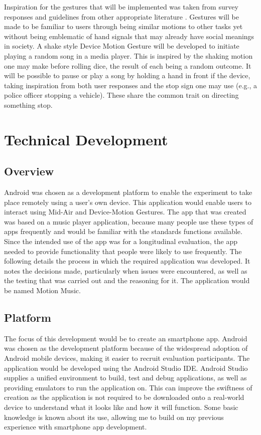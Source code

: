 \documentclass{l4proj}
\begin{document}
Inspiration for the gestures that will be implemented was taken from survey responses and guidelines from other appropriate literature \citep{rico_usable_2010}. Gestures will be made to be familiar to users through being similar motions to other tasks yet without being emblematic of hand signals that may already have social meanings in society. A shake style Device Motion Gesture will be developed to initiate playing a random song in a media player. This is inspired by the shaking motion one may make before rolling dice, the result of each being a random outcome. It will be possible to pause or play a song by holding a hand in front if the device, taking inspiration from both user responses and the stop sign one may use (e.g., a police officer stopping a vehicle). These share the common trait on directing something stop.


\chapter{Technical Development}

\section{Overview}
Android was chosen as a development platform to enable the experiment to take place remotely using a user's own device. This application would enable users to interact using Mid-Air and Device-Motion Gestures. The app that was created was based on a music player application, because many people use these types of apps frequently and would be familiar with the standards functions available. Since the intended use of the app was for a longitudinal evaluation, the app needed to provide functionality that people were likely to use frequently. The following details the process in which the required application was developed. It notes the decisions made, particularly when issues were encountered, as well as the testing that was carried out and the reasoning for it. The application would be named Motion Music.

\section{Platform}

The focus of this development would be to create an smartphone app. Android was chosen as the development platform because of the widespread adoption of Android mobile devices, making it easier to recruit evaluation participants. The application would be developed using the Android Studio IDE. Android Studio supplies a unified environment to build, test and debug applications, as well as providing emulators to run the application on. This can improve the swiftness of creation as the application is not required to be downloaded onto a real-world device to understand what it looks like and how it will function. Some basic knowledge is known about its use, allowing me to build on my previous experience with smartphone app development.
\end{document}
